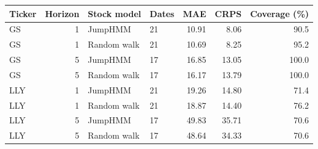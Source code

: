\begin{tabular}{lrllrrr}
\toprule
Ticker & Horizon & Stock model & Dates & MAE & CRPS & Coverage (\%) \\
\midrule
GS & 1 & JumpHMM & 21 & 10.91 & 8.06 & 90.5 \\
GS & 1 & Random walk & 21 & 10.69 & 8.25 & 95.2 \\
GS & 5 & JumpHMM & 17 & 16.85 & 13.05 & 100.0 \\
GS & 5 & Random walk & 17 & 16.17 & 13.79 & 100.0 \\
LLY & 1 & JumpHMM & 21 & 19.26 & 14.80 & 71.4 \\
LLY & 1 & Random walk & 21 & 18.87 & 14.40 & 76.2 \\
LLY & 5 & JumpHMM & 17 & 49.83 & 35.71 & 70.6 \\
LLY & 5 & Random walk & 17 & 48.64 & 34.33 & 70.6 \\
\bottomrule\end{tabular}
